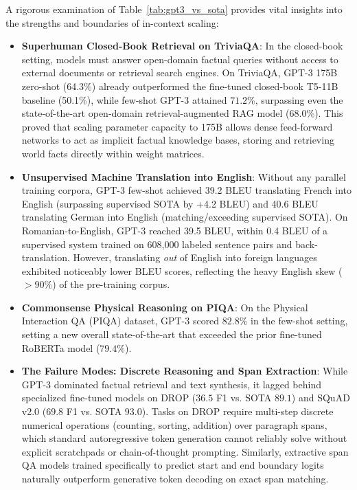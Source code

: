 \documentclass[../../../main.tex]{subfiles}
\begin{document}
A rigorous examination of Table~\ref{tab:gpt3_vs_sota} provides vital insights into the strengths and boundaries of in-context scaling:
\begin{itemize}
    \item \textbf{Superhuman Closed-Book Retrieval on TriviaQA}: In the closed-book setting, models must answer open-domain factual queries without access to external documents or retrieval search engines. On TriviaQA, GPT-3 175B zero-shot (64.3\%) already outperformed the fine-tuned closed-book T5-11B baseline (50.1\%), while few-shot GPT-3 attained $71.2\%$, surpassing even the state-of-the-art open-domain retrieval-augmented RAG model ($68.0\%$). This proved that scaling parameter capacity to 175B allows dense feed-forward networks to act as implicit factual knowledge bases, storing and retrieving world facts directly within weight matrices.
    
    \item \textbf{Unsupervised Machine Translation into English}: Without any parallel training corpora, GPT-3 few-shot achieved 39.2 BLEU translating French into English (surpassing supervised SOTA by +4.2 BLEU) and 40.6 BLEU translating German into English (matching/exceeding supervised SOTA). On Romanian-to-English, GPT-3 reached 39.5 BLEU, within 0.4 BLEU of a supervised system trained on 608,000 labeled sentence pairs and back-translation. However, translating \emph{out} of English into foreign languages exhibited noticeably lower BLEU scores, reflecting the heavy English skew ($>90\%$) of the pre-training corpus.
    
    \item \textbf{Commonsense Physical Reasoning on PIQA}: On the Physical Interaction QA (PIQA) dataset, GPT-3 scored $82.8\%$ in the few-shot setting, setting a new overall state-of-the-art that exceeded the prior fine-tuned RoBERTa model ($79.4\%$).
    
    \item \textbf{The Failure Modes: Discrete Reasoning and Span Extraction}: While GPT-3 dominated factual retrieval and text synthesis, it lagged behind specialized fine-tuned models on DROP ($36.5$ F1 vs. SOTA $89.1$) and SQuAD v2.0 ($69.8$ F1 vs. SOTA $93.0$). Tasks on DROP require multi-step discrete numerical operations (counting, sorting, addition) over paragraph spans, which standard autoregressive token generation cannot reliably solve without explicit scratchpads or chain-of-thought prompting. Similarly, extractive span QA models trained specifically to predict start and end boundary logits naturally outperform generative token decoding on exact span matching.
\end{itemize}
\end{document}

